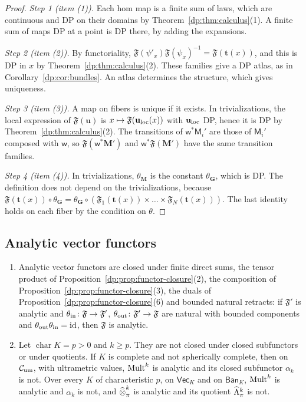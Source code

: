 \begin{proof}
\emph{Step 1 (item (1)).} Each hom map is a finite sum of laws, which are continuous and DP on their domains by Theorem~\ref{dp:thm:calculus}(1). A finite sum of maps DP at a point is DP there, by adding the expansions.

\emph{Step 2 (item (2)).} By functoriality, $\mathfrak F(\psi'_x)\mathfrak F(\psi_x)^{-1}=\mathfrak F(\mathbf t(x))$, and this is DP in $x$ by Theorem~\ref{dp:thm:calculus}(2). These families give a DP atlas, as in Corollary~\ref{dp:cor:bundles}. An atlas determines the structure, which gives uniqueness.

\emph{Step 3 (item (3)).} A map on fibers is unique if it exists. In trivializations, the local expression of $\mathfrak F(\mathbf u)$ is $x\mapsto\mathfrak F(\mathbf u_{\rm loc}(x))$ with $\mathbf u_{\rm loc}$ DP, hence it is DP by Theorem~\ref{dp:thm:calculus}(2). The transitions of $\mathsf w^*\mathsf M_i'$ are those of $\mathsf M_i'$ composed with $\mathsf w$, so $\mathfrak F(\mathsf w^*\mathbf M')$ and $\mathsf w^*\mathfrak F(\mathbf M')$ have the same transition families.

\emph{Step 4 (item (4)).} In trivializations, $\theta_{\mathbf M}$ is the constant $\theta_{\mathbf G}$, which is DP. The definition does not depend on the trivializations, because $\mathfrak F(\mathbf t(x))\circ\theta_{\mathbf G}=\theta_{\mathbf G}\circ(\mathfrak F_1(\mathbf t(x))\times\dots\times\mathfrak F_N(\mathbf t(x)))$. The last identity holds on each fiber by the condition on $\theta$.
\end{proof}

\subsection{Analytic vector functors}

\begin{proposition}\label{dp:prop:analytic-closure}
\leavevmode
\begin{enumerate}
\item Analytic vector functors are closed under finite direct sums, the tensor product of Proposition~\ref{dp:prop:functor-closure}\textup{(2)}, the composition of Proposition~\ref{dp:prop:functor-closure}\textup{(3)}, the duals of Proposition~\ref{dp:prop:functor-closure}\textup{(6)} and bounded natural retracts: if $\mathfrak F'$ is analytic and $\theta_{\rm in}\colon\mathfrak F\to\mathfrak F'$, $\theta_{\rm out}\colon\mathfrak F'\to\mathfrak F$ are natural with bounded components and $\theta_{\rm out}\theta_{\rm in}=\mathrm{id}$, then $\mathfrak F$ is analytic.
\item Let $\operatorname{char}K=p>0$ and $k\ge p$. They are not closed under closed subfunctors or under quotients. If $K$ is complete and not spherically complete, then on $\mathcal{C}_{\rm um}$, with ultrametric values, $\operatorname{Mult}^k$ is analytic and its closed subfunctor $\alpha_k$ is not. Over every $K$ of characteristic $p$, on $\mathsf{Vec}_K$ and on $\mathsf{Ban}_K$, $\operatorname{Mult}^k$ is analytic and $\alpha_k$ is not, and $\mathbin{\widehat\otimes}^k_\pi$ is analytic and its quotient $\widehat\Lambda^k_\pi$ is not.
\end{enumerate}
\end{proposition}

